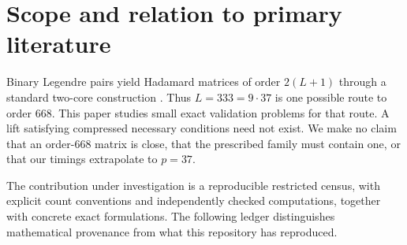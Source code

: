 \documentclass[11pt]{article}
\begin{document}
\begin{abstract}
A focused mathematical audit proves a prime-kernel divisibility corollary:
for odd prime $q\mid N$, fixed length-$N$ compression fibers of normalized
binary Legendre pairs of length $qN$ have ordered size divisible by $q^3$.
It explains the ternary factor 27 and yields a third phase gauge. The underlying
one-row multiplier obstruction has an explicit prior public derivation;
these consequences strengthen the exposition without establishing a new
research-paper contribution.
An exact simultaneous-compression margin obstruction is then proved and
challenged on every frozen branch. It rejects none. A positive and an empty
branch have identical margin profiles and alternate feasible sets, proving
that this relaxation loses information needed to explain residual emptiness.
\end{abstract}

\section{Scope and relation to primary literature}
Binary Legendre pairs yield Hadamard matrices of order $2(L+1)$ through a
standard two-core construction \cite{fletcher}. Thus $L=333=9\cdot37$ is one
possible route to order 668. This paper studies small exact validation
problems for that route. A lift satisfying compressed necessary conditions
need not exist. We make no claim that an order-668 matrix is close, that the
prescribed family must contain one, or that our timings extrapolate to $p=37$.

The contribution under investigation is a reproducible restricted census,
with explicit count conventions and independently checked computations,
together with concrete exact formulations. The following ledger distinguishes
mathematical provenance from what this repository has reproduced.
\end{document}

